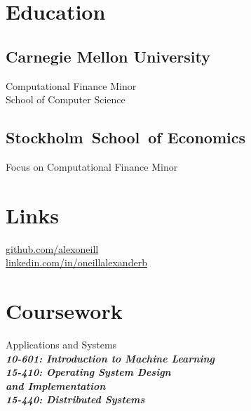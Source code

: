 \documentclass[letterpaper]{deedy-resume}
\begin{document}

  \begin{minipage}[t]{0.33\textwidth}
    \section{Education}
      \subsection{Carnegie Mellon University}
        Computational Finance Minor \\
        School of Computer Science \\

    \sectionspace
    \sectionspace

      \subsection{\mbox{Stockholm School of} \mbox{Economics}}
        Focus on Computational Finance Minor

    \sectionspace

    \section{Links}
      \href{https://github.com/alexoneill}
           {github.com/alexoneill}\\
      \href{https://linkedin.com/in/oneillalexanderb}
           {linkedin.com/in/oneillalexanderb} \\

    \sectionspace


    \section{Coursework}

    Applications and Systems\\
      \textit{\textbf{\footnotesize {
        \qquad{} 10-601: Introduction to Machine Learning\\
        \qquad{} 15-410: Operating System Design\\
        \qquad{}\qquad{} and Implementation\\
        \qquad{} 15-440: Distributed Systems\\
      }}}


\end{minipage}
\end{document}
